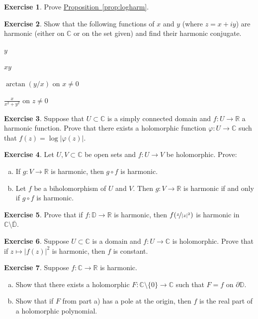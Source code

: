 \documentclass[12pt,openany]{book}
\newcommand{\sabs}[1]{\lvert {#1} \rvert}
\newcommand{\C}{{\mathbb{C}}}
\newcommand{\R}{{\mathbb{R}}}
\newcommand{\D}{{\mathbb{D}}}
\theoremstyle{plain}
\theoremstyle{remark}
\theoremstyle{definition}
\newenvironment{exbox}{%
    \def\FrameCommand{\vrule width 1pt \relax\hspace{10pt}}%
    \MakeFramed{\advance\hsize-\width\FrameRestore}%
}{%
    \endMakeFramed
}
\newenvironment{exparts}{%
    \leavevmode\begin{enumerate}[a),noitemsep,topsep=0pt,parsep=0pt,partopsep=0pt]
}{%
    \end{enumerate}
}
\newenvironment{expartshor}[1]{%
    \begingroup%
    \NumTabs{#1}%
    \leavevmode%
    \par%
    \begin{enumerate*}[a),itemjoin={\tab}]
}{%
    \end{enumerate*}\endgroup\par
}
\theoremstyle{exercise}
\newtheorem{exercise}{Exercise}[section]
\theoremstyle{example}
\newcommand{\propref}[1]{\hyperref[#1]{Proposition~\ref*{#1}}}
\begin{document}
\begin{savenotes}
\begin{exbox}
\begin{exercise}
Prove \propref{prop:logharm}.
\end{exercise}

\begin{exercise}
Show that the following functions of $x$ and $y$ (where
$z = x+iy$) are
harmonic (either on $\C$ or on the set given)
and find their harmonic conjugate.
\smallskip
\begin{expartshor}{5}
\item
$y$
\item
$xy$
\item
$\arctan(y/x)$ on $x \not= 0$
\item
$\frac{x}{x^2+y^2}$ on $z\not=0$
\end{expartshor}
\end{exercise}

\begin{exercise}
Suppose that $U \subset \C$ is a simply connected domain
and $f \colon U \to \R$ a harmonic function.  Prove that there exists
a holomorphic function $\varphi \colon U \to \C$ such that
$f(z) = \log \sabs{\varphi(z)}$.
\end{exercise}

\begin{exercise}
Let $U,V \subset \C$ be open sets and
$f \colon U \to V$ be holomorphic. Prove:
\begin{exparts}
\item
If $g \colon V \to \R$ is harmonic, then
$g \circ f$ is harmonic.
\item
Let $f$ be a biholomorphism of $U$ and $V$.
Then $g \colon V \to \R$ is harmonic if and only if
$g \circ f$ is harmonic.
\end{exparts}
\end{exercise}

\begin{exercise}
Prove that if $f \colon \D \to \R$ is harmonic, then
$f(\nicefrac{z}{\sabs{z}^2})$ is harmonic in $\C \setminus
\overline{\D}$.
\end{exercise}

\begin{exercise}
Suppose $U \subset \C$ is a domain and
$f \colon U \to \C$ is holomorphic.  Prove that
if $z \mapsto \sabs{f(z)}^2$ is harmonic, then $f$ is constant.
\end{exercise}

\begin{exercise}
Suppose $f \colon \C \to \R$ is harmonic.
\begin{exparts}
\item
Show that there exists
a holomorphic $F \colon \C \setminus \{ 0 \} \to \C$
such that $F=f$ on $\partial \D$.
\item
Show that if $F$ from part a) has a pole at the origin, then $f$
is the real part of a holomorphic polynomial.
\end{exparts}
\end{exercise}


\end{exbox}
\end{savenotes}
\end{document}
